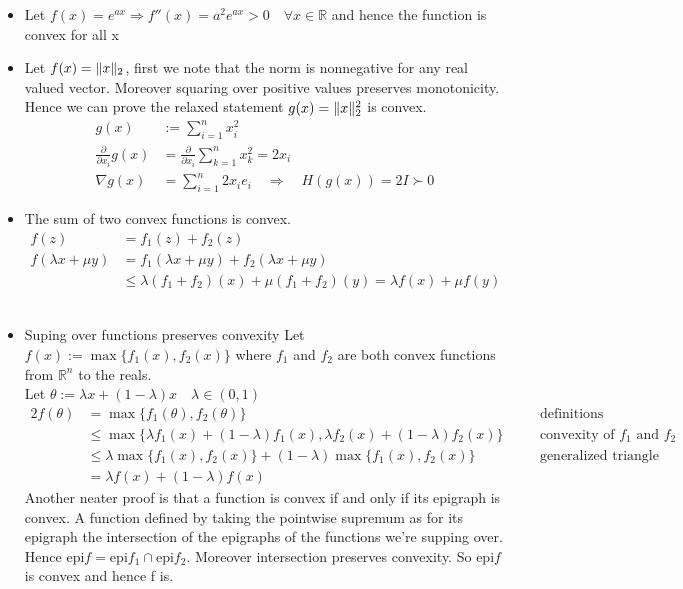 \documentclass{article}
\DeclarePairedDelimiter{\norm}{\lVert}{\rVert}
\begin{document}
		\begin{itemize}
			\item Let $f(x) = e^{ax} \Rightarrow f''(x) = a^2e^{ax} > 0 \quad  \forall x \in \mathbb R$ and hence the function is convex for all x
			\item Let $f(x) = \norm x_2$, first we note that the norm is nonnegative for any real valued vector. Moreover squaring over positive values preserves monotonicity. Hence we can prove the relaxed statement $g(x) = \norm x _2 ^2$ is convex.
		\begin{align}
		g(x) &:= \sum_{i=1}^{n}x_i^2 \\[1ex]
		\frac{\partial}{\partial x_i}g(x)  &= \frac{\partial}{\partial x_i}\sum_{k=1}^n x_k^2 = 2x_i\\[2ex]
		\nabla g(x) &= \sum_{i=1}^{n}2x_i e_i \quad \Rightarrow \quad 
		H(g(x)) = 2I \succ 0
		\end{align}
		\item The sum of two convex functions is convex. \\
		\begin{align*}
			f(z) &= f_1(z) + f_2(z) \\[2ex]
			f(\lambda x + \mu y) &= f_1(\lambda x + \mu y) + f_2(\lambda x + \mu y)\\[2ex]
			&\leq \lambda (f_1 + f_2)(x) + \mu(f_1 + f_2)(y) = \lambda f(x) + \mu f(y)
		\end{align*}\\
		
		\clearpage 
		
		\item Suping over functions preserves convexity
		Let $f(x) := \max \{f_1(x), f_2(x)\}$ where $f_1$ and $f_2$ are both convex functions from $\mathbb R^n $ to the reals. \\[2ex]
		Let $\theta := \lambda x + (1-\lambda) x \quad \lambda \in (0,1)$
		\begin{alignat*}{2}
			f(\theta) &= \max \{f_1(\theta), f_2(\theta)\} 
						\quad &&\text{definitions}\\
					  &\leq \max\{\lambda f_1(x) + (1-\lambda) f_1(x), \lambda  f_2(x) + (1-\lambda) f_2(x)\}
					  \quad && \text{convexity of } f_1 \text{ and } f_2\\
					  &\leq \lambda \max \{f_1(x),f_2(x)\} + (1-\lambda)   \max \{f_1(x),f_2(x)\}
					  \quad && \text{generalized triangle inequality}\\
					  &= \lambda f(x) + (1-\lambda)f(x)
		\end{alignat*}
		Another neater proof is that a function is convex if and only if its epigraph is convex. A function defined by taking the pointwise supremum as for its epigraph the intersection of the epigraphs of the functions we're supping over. Hence $\mathrm{epi} f = \mathrm{epi} f_1 \cap \mathrm{epi} f_2$. Moreover intersection preserves convexity. So $\mathrm{epi} f$ is convex and hence f is. 
		

\end{itemize}
\end{document}
